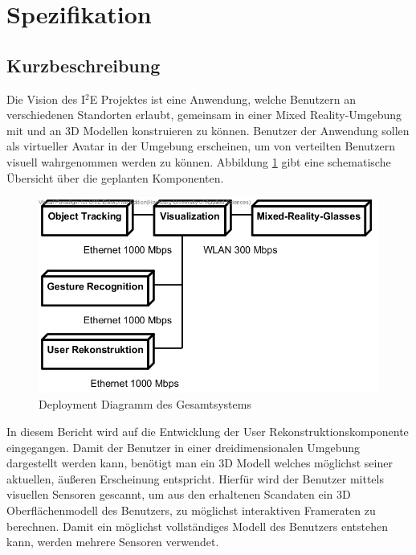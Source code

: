 \section{Spezifikation}

\subsection{Kurzbeschreibung}
Die Vision des I$^2$E Projektes ist eine Anwendung, welche Benutzern an verschiedenen Standorten erlaubt, gemeinsam in einer Mixed Reality-Umgebung mit und an 3D Modellen konstruieren zu können. Benutzer der Anwendung sollen als virtueller Avatar in der Umgebung erscheinen, um von verteilten Benutzern visuell wahrgenommen werden zu können. Abbildung \ref{fig:bigpicture} gibt eine schematische Übersicht über die geplanten Komponenten.\\

\begin{figure}[h]
	\begin{center}		
		\includegraphics[width=.5\textwidth, keepaspectratio]{img/deployment}
		\caption{Deployment Diagramm des Gesamtsystems}
		\label{fig:bigpicture}
	\end{center}
\end{figure}

In diesem Bericht wird auf die Entwicklung der User Rekonstruktionskomponente eingegangen. Damit der Benutzer in einer dreidimensionalen Umgebung dargestellt werden kann, benötigt man ein 3D Modell welches möglichst seiner aktuellen, äußeren Erscheinung entspricht. Hierfür wird der Benutzer mittels visuellen Sensoren gescannt, um aus den erhaltenen Scandaten ein 3D Oberflächenmodell des Benutzers, zu möglichst interaktiven Frameraten zu berechnen. Damit ein möglichst vollständiges Modell des Benutzers entstehen kann, werden mehrere Sensoren verwendet.


